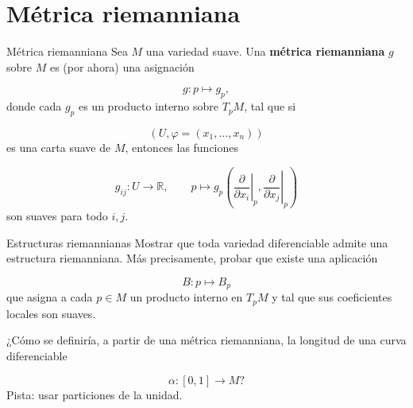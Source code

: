 \section{Métrica riemanniana}
\begin{bookdefinition}{Métrica riemanniana}
Sea $M$ una variedad suave. Una \textbf{métrica riemanniana} $g$ sobre $M$ es (por ahora) una asignación

\[
g:p\mapsto g_p,
\]
donde cada $g_p$ es un producto interno sobre $T_pM$, tal que si

\[
(U,\varphi=(x_1,\dots,x_n))
\]
es una carta suave de $M$, entonces las funciones

\[
g_{ij}:U\to\mathbb R,
\qquad
p\mapsto g_p\left(\left.\frac{\partial}{\partial x_i}\right|_p,\left.\frac{\partial}{\partial x_j}\right|_p\right)
\]
son suaves para todo $i,j$.

\end{bookdefinition}
\begin{bookexercise}{Estructuras riemannianas}
Mostrar que toda variedad diferenciable admite una estructura riemanniana. Más precisamente, probar que existe una aplicación

\[
B:p\mapsto B_p
\]
que asigna a cada $p\in M$ un producto interno en $T_pM$ y tal que sus coeficientes locales son suaves.

¿Cómo se definiría, a partir de una métrica riemanniana, la longitud de una curva diferenciable

\[
\alpha:[0,1]\to M?
\]
Pista: usar particiones de la unidad.

\end{bookexercise}
